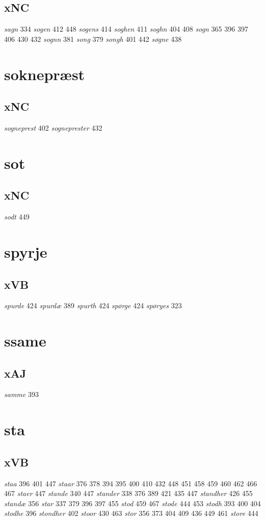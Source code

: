\documentclass[a4paper,twocolumn]{article}
\begin{document}
\subsection{xNC}
\label{sec:org866e0ef}
\emph{sagn} 334 \emph{sogen} 412 448 \emph{sogens} 414 \emph{soghen} 411 \emph{soghn} 404 408 \emph{sogn} 365 396 397 406 430 432 \emph{sognn} 381 \emph{song} 379 \emph{songh} 401 442 \emph{søgne} 438 
\section{soknepræst}
\label{sec:orge45137e}
\subsection{xNC}
\label{sec:orgc3569ec}
\emph{sogneprest} 402 \emph{sogneprester} 432 
\section{sot}
\label{sec:org7df8886}
\subsection{xNC}
\label{sec:org67518fa}
\emph{sodt} 449 
\section{spyrje}
\label{sec:orgbfb9d9a}
\subsection{xVB}
\label{sec:orge42907f}
\emph{spurde} 424 \emph{spurdæ} 389 \emph{spurth} 424 \emph{spørge} 424 \emph{spøryes} 323 
\section{ssame}
\label{sec:orgc54b67b}
\subsection{xAJ}
\label{sec:orgc82bf7e}
\emph{samme} 393 
\section{sta}
\label{sec:org102d994}
\subsection{xVB}
\label{sec:org8969a40}
\emph{staa} 396 401 447 \emph{staar} 376 378 394 395 400 410 432 448 451 458 459 460 462 466 467 \emph{staer} 447 \emph{stande} 340 447 \emph{stander} 338 376 389 421 435 447 \emph{standher} 426 455 \emph{standæ} 356 \emph{star} 337 379 396 397 455 \emph{stod} 459 467 \emph{stode} 444 453 \emph{stodh} 393 400 404 \emph{stodhe} 396 \emph{stondher} 402 \emph{stoor} 430 463 \emph{stor} 356 373 404 409 436 449 461 \emph{store} 444 
\end{document}
